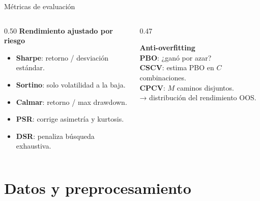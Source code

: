 \documentclass[aspectratio=169, spanish, 12pt]{beamer}
\begin{document}
\begin{frame}{Métricas de evaluación}
  \begin{columns}[T]
    \begin{column}{0.50\textwidth}
      \textbf{\faChartBar\; Rendimiento ajustado por riesgo}
      \begin{itemize}
        \item \textbf{Sharpe}: retorno / desviación estándar.
        \item \textbf{Sortino}: solo volatilidad a la baja.
        \item \textbf{Calmar}: retorno / max drawdown.
        \item \textbf{PSR}: corrige asimetría y kurtosis.
        \item \textbf{DSR}: penaliza búsqueda exhaustiva.
      \end{itemize}
    \end{column}
    \begin{column}{0.47\textwidth}
      \begin{tcolorbox}[familybox=fiubablue]
        {\large\textbf{\faUserCheck\; Anti-overfitting}}\\[0.5em]
        \normalsize
        \textbf{PBO}: ¿ganó por azar?\\[0.3em]
        \textbf{CSCV}: estima PBO en $C$ combinaciones.\\[0.3em]
        \textbf{CPCV}: $M$ caminos disjuntos.\\
        → distribución del rendimiento OOS.
      \end{tcolorbox}
    \end{column}
  \end{columns}
\end{frame}

\section{Datos y preprocesamiento}  %
\end{document}
